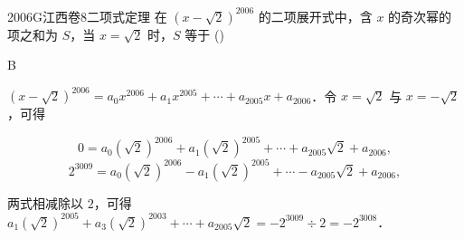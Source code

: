 
\begin{problem}{2006}{G}{江西卷}{8}{二项式定理}
在 $(x-\sqrt{2})^{2006}$ 的二项展开式中，含 $x$ 的奇次幂的项之和为 $S$，当 $x=\sqrt{2}$ 时，$S$ 等于 (\hspace{1cm})
\begin{choices}
\end{choices}
\end{problem}

\begin{answer}
B
\end{answer}

\begin{solutions}
$(x-\sqrt{2})^{2006}=a_0x^{2006}+a_1x^{2005}+\cdots+a_{2005}x+a_{2006}$．令 $x=\sqrt{2}$ 与 $x=-\sqrt{2}$，可得

$$
0=a_0(\sqrt{2})^{2006}+a_1(\sqrt{2})^{2005}+\cdots+a_{2005}\sqrt{2}+a_{2006},
$$
$$
2^{3009}=a_0(\sqrt{2})^{2006}-a_1(\sqrt{2})^{2005}+\cdots-a_{2005}\sqrt{2}+a_{2006},
$$

两式相减除以 $2$，可得 $a_1(\sqrt{2})^{2005}+a_3(\sqrt{2})^{2003}+\cdots+a_{2005}\sqrt{2}=-2^{3009}\div 2=-2^{3008}$．
\end{solutions}